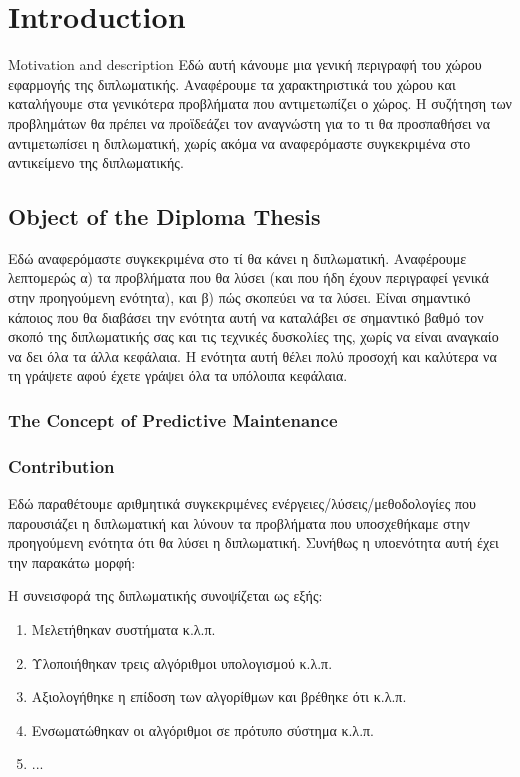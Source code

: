 \chapter{Introduction}
\label{chap1}

Motivation and description
Εδώ αυτή κάνουμε μια γενική περιγραφή του χώρου εφαρμογής της διπλωματικής. Αναφέρουμε τα χαρακτηριστικά του χώρου και καταλήγουμε στα γενικότερα προβλήματα που αντιμετωπίζει ο χώρος. Η συζήτηση των προβλημάτων θα πρέπει να προϊδεάζει τον αναγνώστη για το τι θα προσπαθήσει να αντιμετωπίσει η διπλωματική, χωρίς ακόμα να αναφερόμαστε συγκεκριμένα στο αντικείμενο της διπλωματικής.
  


\section{Object of the Diploma Thesis}

Εδώ αναφερόμαστε συγκεκριμένα στο τί θα κάνει η διπλωματική. Αναφέρουμε λεπτομερώς α) τα προβλήματα που θα λύσει (και που ήδη έχουν περιγραφεί γενικά στην προηγούμενη ενότητα), και β) πώς σκοπεύει να τα λύσει. 
Είναι σημαντικό κάποιος που θα διαβάσει την ενότητα αυτή να καταλάβει σε σημαντικό βαθμό τον σκοπό της διπλωματικής σας και τις τεχνικές δυσκολίες της, χωρίς να είναι αναγκαίο να δει όλα τα άλλα κεφάλαια. Η ενότητα αυτή θέλει πολύ προσοχή και καλύτερα να τη γράψετε αφού έχετε γράψει όλα τα υπόλοιπα κεφάλαια.

\subsection{The Concept of Predictive Maintenance}

\subsection{Contribution}
Εδώ παραθέτουμε αριθμητικά συγκεκριμένες ενέργειες/λύσεις/μεθοδολογίες που παρουσιάζει η διπλωματική και λύνουν τα προβλήματα που υποσχεθήκαμε στην προηγούμενη ενότητα ότι θα λύσει η διπλωματική. Συνήθως η υποενότητα αυτή έχει την παρακάτω μορφή:

Η συνεισφορά της διπλωματικής συνοψίζεται ως εξής:
\begin{enumerate}
\item Μελετήθηκαν συστήματα κ.λ.π.
\item Υλοποιήθηκαν τρεις αλγόριθμοι υπολογισμού κ.λ.π.
\item Αξιολογήθηκε η επίδοση των αλγορίθμων και βρέθηκε ότι κ.λ.π.
\item Ενσωματώθηκαν οι αλγόριθμοι σε πρότυπο σύστημα κ.λ.π.
\item ...
\end{enumerate}


